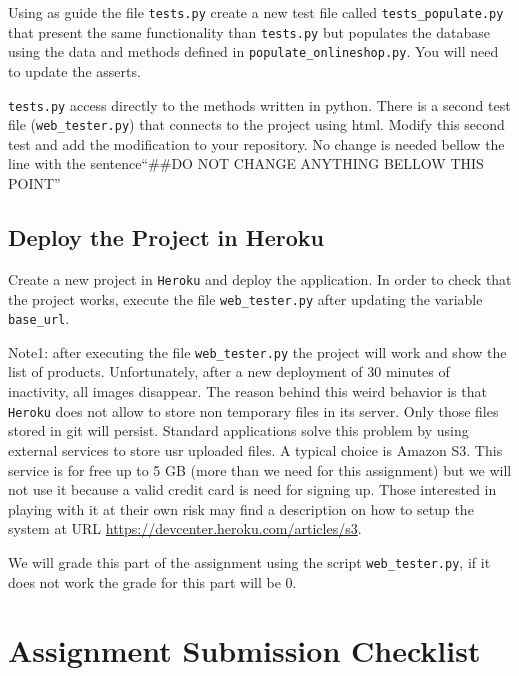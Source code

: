 \documentclass[12pt]{article} %
\newcommand{\ttt}[1]{\texttt{#1}}%
\newcommand{\proyecto}{\texttt{onlineshop}}%
\newcommand{\heroku}{\texttt{Heroku}}
\newcommand{\populatescript}{\texttt{populate\_\proyecto.py}}
\begin{document}
Using as guide the file \texttt{tests.py} create a new test file called \texttt{tests\_populate.py} that present the same functionality than \texttt{tests.py} 
but populates the database using the data and methods defined in \populatescript. You will need to update the asserts.

\texttt{tests.py} access directly to the methods written in python. There is a second test file (\ttt{web\_tester.py})  that connects to the project using html. Modify this second test and add the modification to your repository. No change is needed bellow the line  with the sentence``\#\#DO NOT CHANGE ANYTHING BELLOW THIS POINT''

\subsection{Deploy the Project in Heroku}
Create a new project in \heroku{} and deploy the application. In order to check that the project works, execute the file \ttt{web\_tester.py} after updating the variable \ttt{base\_url}. 

Note1: after executing the file  \ttt{web\_tester.py} the project will work and show the list of products. Unfortunately, after a new deployment of 30 minutes of inactivity, all images disappear. The reason behind this weird behavior is that  \heroku{} does not allow to store non temporary files in its server. Only those files stored in git will persist. Standard applications solve this problem by using external services to store usr uploaded files. A typical choice is Amazon S3. This service is for free up to 5 GB (more than we need for this assignment) but we will not use it because a valid credit card is need for signing up. Those interested in playing with it at their own risk may find a description on how to setup the system at URL  \url{https://devcenter.heroku.com/articles/s3}.

We will grade this part of the assignment using the script \ttt{web\_tester.py}, if it does not work the grade for this part will be 0. 

\section{Assignment Submission Checklist} %
\end{document}

